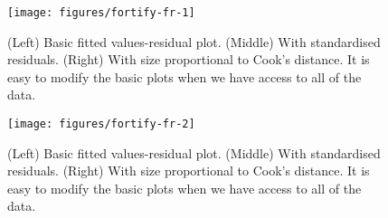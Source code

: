 \begin{Shaded}
\begin{Highlighting}[]
\StringTok{ }\StringTok{ } 
\StringTok{ }
\StringTok{  }\NormalTok{(} \NormalTok{, } \NormalTok{, } \NormalTok{) +}\StringTok{ }
\StringTok{  }\NormalTok{() +}\StringTok{ }
\StringTok{  }\NormalTok{(} \NormalTok{, } 
\end{Highlighting}
\end{Shaded}

\begin{figure}
\texttt{[image: figures/fortify-fr-1]} \caption{(Left) Basic fitted values-residual plot. (Middle) With standardised residuals. (Right) With size proportional to Cook's distance. It is easy to modify the basic plots when we have access to all of the data.\label{fig:fortify-fr1}}
\end{figure}

\begin{Shaded}
\begin{Highlighting}[]
\StringTok{ }\NormalTok{(} 
\end{Highlighting}
\end{Shaded}

\begin{figure}
\texttt{[image: figures/fortify-fr-2]} \caption{(Left) Basic fitted values-residual plot. (Middle) With standardised residuals. (Right) With size proportional to Cook's distance. It is easy to modify the basic plots when we have access to all of the data.\label{fig:fortify-fr2}}
\end{figure}

\begin{Shaded}
\begin{Highlighting}[]
\StringTok{ }\NormalTok{(} \StringTok{ }\NormalTok{(}\NormalTok{)}
\end{Highlighting}
\end{Shaded}


